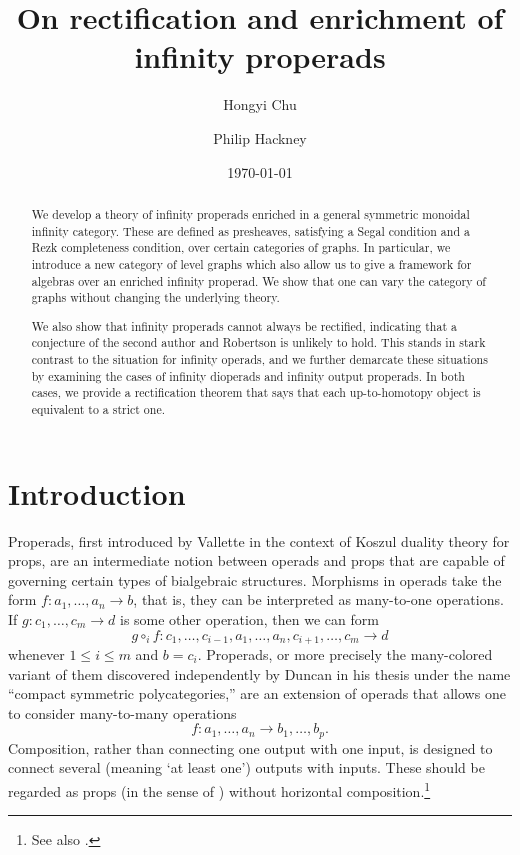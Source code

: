 \documentclass{amsart}
\title{On rectification and enrichment of infinity properads}
\author{Hongyi Chu}
\author{Philip Hackney}
\date{\today}
\numberwithin{theorem}{subsection}
\theoremstyle{definition}
\begin{document}
\begin{abstract}
We develop a theory of infinity properads enriched in a general symmetric monoidal infinity category.
These are defined as presheaves, satisfying a Segal condition and a Rezk completeness condition, over certain categories of graphs.
In particular, we introduce a new category of level graphs which also allow us to give a framework for algebras over an enriched infinity properad.
We show that one can vary the category of graphs without changing the underlying theory.

We also show that infinity properads cannot always be rectified, indicating that a conjecture of the second author and Robertson is unlikely to hold.
This stands in stark contrast to the situation for infinity operads, and we further demarcate these situations by examining the cases of infinity dioperads and infinity output properads.
In both cases, we provide a rectification theorem that says that each up-to-homotopy object is equivalent to a strict one.
\end{abstract}

\maketitle

\tableofcontents

\section{Introduction}

Properads, first introduced by Vallette \cite{Vallette:KDP} in the context of Koszul duality theory for props, are an intermediate notion between operads and props that are capable of governing certain types of bialgebraic structures.
Morphisms in operads take the form $f \colon a_1, \dots, a_n \to b$, that is, they can be interpreted as many-to-one operations.
If $g \colon c_1, \dots, c_m \to d$ is some other operation, then we can form \[ g\circ_i f \colon c_1, \dots, c_{i-1}, a_1, \dots, a_n, c_{i+1}, \dots, c_m \to d\]  whenever $1\leq i \leq m$ and $b = c_i.$
Properads, or more precisely the many-colored variant of them discovered independently by Duncan in his thesis \cite[\S6.1]{Duncan:TQC} under the name ``compact symmetric polycategories,'' are an extension of operads that allows one to consider many-to-many operations \[f \colon a_1, \dots, a_n \to b_1, \dots, b_p.\]
Composition, rather than connecting one output with one input, is designed to connect several (meaning `at least one') outputs with inputs.
These should be regarded as props (in the sense of \cite[\S24]{MacLane:CA}) without horizontal composition.\footnote{See also \cite[p.80]{Duncan:TQC}.}
\end{document}
